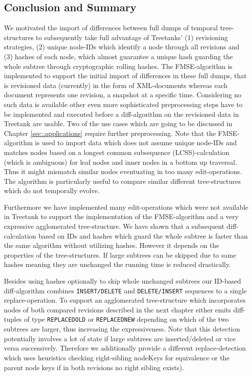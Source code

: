 \subsection{Conclusion and Summary}
We motivated the import of differences between full dumps of temporal tree-structures to subsequently take full advantage of Treetanks' (1) revisioning strategies, (2) unique node-IDs which identify a node through all revisions and (3) hashes of each node, which almost guarantee a unique hash guarding the whole subtree through cryptographic rolling hashes. The FMSE-algorithm is implemented to support the initial import of differences in these full dumps, that is revisioned data (currently) in the form of XML-documents whereas each document represents one revision, a snapshot at a specific time. Considering no such data is available other even more sophisticated preprocessing steps have to be implemented and executed before a diff-algorithm on the revisioned data in Treetank are usable. Two of the use cases which are going to be discussed in Chapter \ref{sec::applications} require further preprocessing. Note that the FMSE-algorithm is used to import data which does not assume unique node-IDs and matches nodes based on a longest common subsequence (LCSS)-calculation (which is ambiguous) for leaf nodes and inner nodes in a bottom up traversal. Thus it might mismatch similar nodes eventuating in too many edit-operations. The algorithm is particularly useful to compare similar different tree-structures which do not temporally evolve.

Furthermore we have implemented many edit-operations which were not available in Treetank to support the implementation of the FMSE-algorithm and a very expressive agglomerated tree-structure. We have shown that a subsequent diff-calculation based on IDs and hashes which guard the whole subtree is faster than the same algorithm without utilizing hashes. However it depends on the properties of the tree-structures. If large subtrees can be skipped due to same hashes meaning they are unchanged the running time is reduced drastically.

Besides using hashes optionally to skip whole unchanged subtrees our ID-based diff-algorithm combines \texttt{INSERT/DELETE} and \texttt{DELETE/INSERT} sequences to a single replace-operation. To support an agglomerated tree-structure which incorporates nodes of both compared revisions described in the next chapter either emits diff-tuples of type \texttt{REPLACEDOLD} or \texttt{REPLACEDNEW} depending on which of the two subtrees are larger, thus increasing the expressiveness. Note that this detection potentially involves a lot of state if large subtrees are inserted/deleted or vice versa successively. Therefore we additionally provide a different replace-detection which uses heuristics checking right-sibling nodeKeys for equivalence or the parent node keys if in both revisions no right sibling exists).

